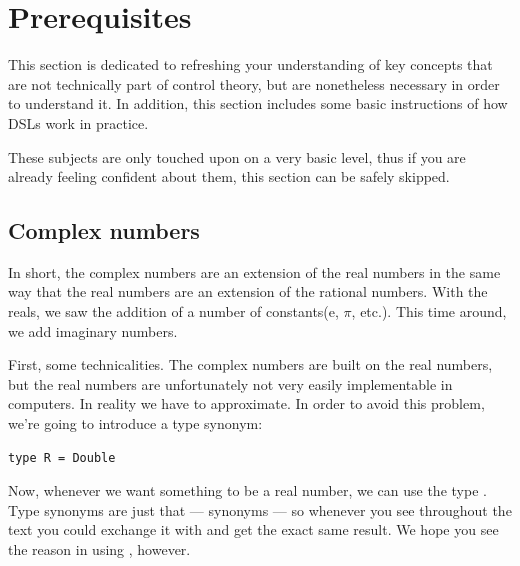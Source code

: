 \graphicspath{ {./Images/} }

\section{Prerequisites}
This section is dedicated to refreshing your understanding of key concepts that are not technically part of control theory, but are nonetheless necessary in order to understand it. In addition, this section includes some basic instructions of how DSLs work in practice.

These subjects are only touched upon on a very basic level, thus if you are already feeling confident about them, this section can be safely skipped.

\subsection{Complex numbers}

In short, the complex numbers are an extension of the real numbers in the same way that the real numbers are an extension of the rational numbers. With the reals, we saw the addition of a number of constants(e, $\pi$, etc.).
This time around, we add imaginary numbers.

First, some technicalities. The complex numbers are built on the real numbers, but the real numbers are unfortunately not very easily implementable in computers. In reality we have to approximate. In order to avoid this problem, we're going to introduce a type synonym: 

\begin{verbatim}
type R = Double 
\end{verbatim}

Now, whenever we want something to be a real number, we can use the type . Type synonyms are just that --- synonyms --- so whenever you see  throughout the text you could exchange it with  and get the exact same result. We hope you see the reason in using , however. 

